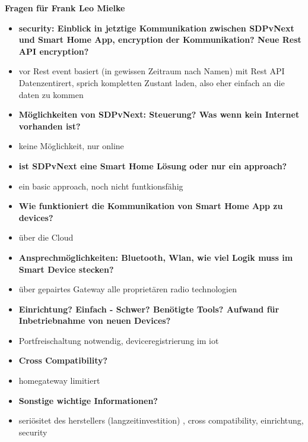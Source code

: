 \textbf{Fragen für Frank Leo Mielke}
	\begin{itemize}
		\item \textbf{security: Einblick in jetztige Kommunikation zwischen SDPvNext und Smart Home App, encryption der Kommunikation? Neue Rest API encryption?}

			\item vor Rest event basiert (in gewissen Zeitraum nach Namen) mit Rest API Datenzentirert, sprich kompletten Zustant laden, also eher einfach an die daten zu kommen

		\item \textbf{Möglichkeiten von SDPvNext: Steuerung? Was wenn kein Internet vorhanden ist?}

			\item keine Möglichkeit, nur online

		\item \textbf{ist SDPvNext eine Smart Home Lösung oder nur ein approach?}

			\item ein basic approach, noch nicht funtkionsfähig

		\item \textbf{Wie funktioniert die Kommunikation von Smart Home App zu devices?}

			\item über die Cloud

		\item \textbf{Ansprechmöglichkeiten: Bluetooth, Wlan, wie viel Logik muss im Smart Device stecken?}

			\item über gepairtes Gateway alle proprietären radio technologien

		\item \textbf{Einrichtung? Einfach - Schwer? Benötigte Tools? Aufwand für Inbetriebnahme von neuen Devices?}

			\item Portfreischaltung notwendig, deviceregistrierung im iot

		\item \textbf{Cross Compatibility?}

			\item homegateway limitiert

		\item \textbf{Sonstige wichtige Informationen?}

			\item seriösitet des herstellers (langzeitinvestition) , cross compatibility, einrichtung, security

	\end{itemize}


